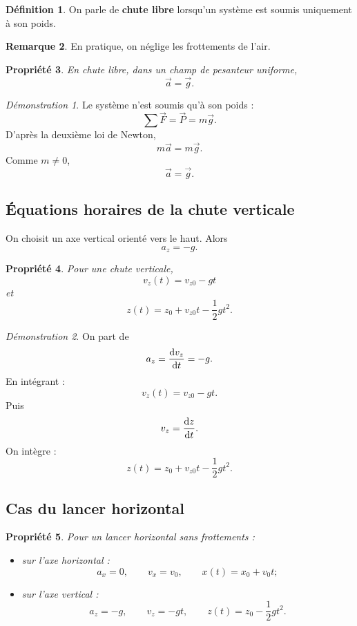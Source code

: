 \documentclass[11pt,a4paper]{article}
\theoremstyle{definition}
\newtheorem{definition}{Définition}[section]
\newtheorem{remarque}[definition]{Remarque}
\theoremstyle{plain}
\newtheorem{propriete}[definition]{Propriété}
\theoremstyle{remark}
\newtheorem*{demonstrationlibre}{Démonstration}
\begin{document}
\begin{definition}
On parle de \textbf{chute libre} lorsqu'un système est soumis uniquement à son poids.
\end{definition}

\begin{remarque}
En pratique, on néglige les frottements de l'air.
\end{remarque}

\begin{propriete}
En chute libre, dans un champ de pesanteur uniforme,
\[
\vec{a}=\vec{g}.
\]
\end{propriete}

\begin{demonstrationlibre}
Le système n'est soumis qu'à son poids :
\[
\sum \vec{F}=\vec{P}=m\vec{g}.
\]
D'après la deuxième loi de Newton,
\[
m\vec{a}=m\vec{g}.
\]
Comme $m\neq0$,
\[
\vec{a}=\vec{g}.
\]
\end{demonstrationlibre}

\subsection{Équations horaires de la chute verticale}

On choisit un axe vertical orienté vers le haut. Alors
\[
a_z=-g.
\]

\begin{propriete}
Pour une chute verticale,
\[
v_z(t)=v_{z0}-gt
\]
et
\[
z(t)=z_0+v_{z0}t-\frac12 gt^2.
\]
\end{propriete}

\begin{demonstrationlibre}
On part de
\[
a_z=\dv{v_z}{t}=-g.
\]
En intégrant :
\[
v_z(t)=v_{z0}-gt.
\]
Puis
\[
v_z=\dv{z}{t}.
\]
On intègre :
\[
z(t)=z_0+v_{z0}t-\frac12 gt^2.
\]
\end{demonstrationlibre}

\subsection{Cas du lancer horizontal}

\begin{propriete}
Pour un lancer horizontal sans frottements :
\begin{itemize}
    \item sur l'axe horizontal :
    \[
    a_x=0,\qquad v_x=v_0,\qquad x(t)=x_0+v_0t ;
    \]
    \item sur l'axe vertical :
    \[
    a_z=-g,\qquad v_z=-gt,\qquad z(t)=z_0-\frac12 gt^2.
    \]
\end{itemize}
\end{propriete}
\end{document}
